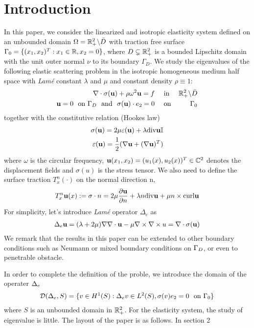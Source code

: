 \documentclass[12pt]{iopart}
\begin{document}
\newcommand{\Np}{\mathcal{N}_p}
\newcommand{\Ns}{\mathcal{N}_s}
\newcommand{\Tp}{\mathcal{T}_p}
\newcommand{\Ts}{\mathcal{T}_s}

\newcommand{\be}{\begin{eqnarray}}
\newcommand{\ee}{\end{eqnarray}}
\newcommand{\ben}{\begin{eqnarray*}}
\newcommand{\een}{\end{eqnarray*}}
\newcommand{\nn}{\nonumber}

\section{Introduction}\label{section1}
In this paper, we consider the linearized and isotropic elasticity system defined on an unbounded domain $\Omega={\mathbb{R}}_+^2\backslash \bar{D}$ with traction free surface $\Gamma_0=\{(x_1,x_2)^T:x_1\in{\mathbb{R}},x_2=0\}$, where $D\subsetneq{\mathbb{R}}^2_+$ is a bounded Lipschitz domain with the unit outer normal $\nu$ to its boundary $\Gamma_D$.
We study the eigenvalues of the  following elastic scattering problem in the isotropic homogeneous medium half space with \emph{Lam\'{e}} constant $\lambda$ and $\mu$ and constant density $\rho\equiv1$:
\be\label{elastic_eq}
\nabla\cdot\sigma(\u) + \rho\omega^2 \u= f \ \ \ \ &\mbox{in }& \R_+^2\bks \bar{D}\\ \label{elastic_bd}
 \u=0 \ \ \mbox{on} \ \Ga_D  \ \ \mbox{and} \ \ \sigma(\u)\cdot e_2=0 \  \ \ \ &\mbox{on}& \ \Ga_0
\ee
together with the constitutive relation (Hookes law)
\ben
\sigma(\u) = 2\mu\ep(\u) + \lambda\div \u \I \\
\ep(\u)=\frac{1}{2}(\na \u +(\na \u)^T)
\een
where $\omega$ is the circular frequency, $\mathbf{u}(x_1,x_2)=(u_1(x),u_2(x))^T\in{\mathbb{C}}^2$ denotes the displacement fields and $\sigma(u)$ is the stress tensor. We also need to define the surface traction $T_x^n (\cdot)$ on the normal direction n,
\ben
T_x^n \u(x) := \sigma\cdot n = 2\mu\frac{\pa \u}{\pa n}+\lambda n\div \u + \mu n \times \curl \u
\een
For simplicity, let's introduce \emph{Lam\'{e}} operator $\Delta_e$ as
\ben
\Delta_e \u = (\lambda+2\mu)\nabla\nabla\cdot \u - \mu\nabla\times\nabla\times u=\nabla\cdot\sigma(\u)
\een
	We remark that the results in
this paper can be extended to other boundary
conditions such as Neumann or mixed boundary conditions on $\Gamma_D$, or even to penetrable obstacle.

	In order to complete the definition of the proble, we introduce the domain of the operater $\Delta_e$
\ben
\mathcal{D}(\De_e,S)=\{v\in H^1(S): \De_e v\in L^2(S), \sigma(v)e_2=0\ \ \mbox{on }\Ga_0\}
\een
where $S$ is an unbounded domain in ${\mathbb{R}}^2_+$.
  For the elasticity system, the study of eigenvalue is little.  
	The layout of the paper is as follows. In section 2 
\end{document}
